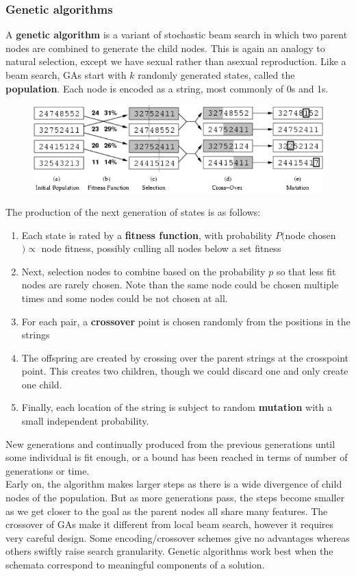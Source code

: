 \documentclass{article}
\newcommand{\n}[0]{\\[\baselineskip]}
\begin{document}
\subsubsection{Genetic algorithms}
A \textbf{genetic algorithm} is a variant of stochastic beam search in which two parent nodes are combined to generate the child nodes. This is again an analogy to natural selection, except we have sexual rather than asexual reproduction. Like a beam search, GAs start with $k$ randomly generated states, called the \textbf{population}. Each node is encoded as a string, most commonly of 0s and 1s. 
\begin{figure}[H]
\centering
\includegraphics[width=1\textwidth, keepaspectratio]{imgs/genetic-algorithm.png}
\end{figure}
\noindent
The production of the next generation of states is as follows:
\begin{enumerate}
\item Each state is rated by a \textbf{fitness function}, with probability $P($node chosen$) \propto $ node fitness, possibly culling all nodes below a set fitness
\item Next, selection nodes to combine based on the probability $p$ so that less fit nodes are rarely chosen. Note than the same node could be chosen multiple times and some nodes could be not chosen at all.
\item For each pair, a \textbf{crossover} point is chosen randomly from the positions in the strings
\item The offspring are created by crossing over the parent strings at the crosspoint point. This creates two children, though we could discard one and only create one child.
\item Finally, each location of the string is subject to random \textbf{mutation} with a small independent probability. 
\end{enumerate}
New generations and continually produced from the previous generations until some individual is fit enough, or a bound has been reached in terms of number of generations or time. 
\n
Early on, the algorithm makes larger steps as there is a wide divergence of child nodes of the population. But as more generations pass, the steps become smaller as we get closer to the goal as the parent nodes all share many features. The crossover of GAs make it different from local beam search, however it requires very careful design. Some encoding/crossover schemes give no advantages whereas others swiftly raise search granularity. Genetic algorithms work best when the schemata correspond to meaningful components of a solution.
\end{document}
